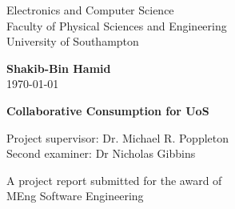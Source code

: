 
			


\begin{titlepage}
    \begin{center}
        \vspace*{1cm}
        
        \LARGE
        Electronics and Computer Science\\
        Faculty of Physical Sciences and Engineering\\
        University of Southampton\\
        
        \vspace{3.0cm}
        
        \large
        \textbf{Shakib-Bin Hamid}\\
        \today\\
        
        \vspace{2.0cm}
        
        \Huge
        \textbf{Collaborative Consumption for UoS}
        
        \vspace{3.0cm}
        
        \large
        Project supervisor: Dr. Michael R. Poppleton\\
        Second examiner: Dr Nicholas Gibbins\\
        
        
        \vfill
        
        A project report submitted for the award of \\
		MEng Software Engineering
        
    \end{center}
\end{titlepage}
